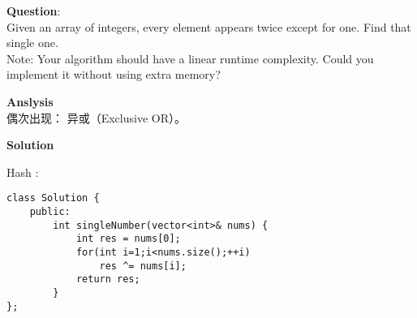     
\begin{description}
    \item{\textbf{Question}}:\\%
		Given an array of integers, every element appears twice except for one. Find that single one.\\
		Note: Your algorithm should have a linear runtime complexity. Could you implement it without using extra memory?\\

    \item{\textbf{Anslysis}}\\
		偶次出现： 异或（Exclusive OR）。\\

    \item{\textbf{Solution}}\\
	\item{Hash} : \\
		\begin{lstlisting}
class Solution {
    public:
        int singleNumber(vector<int>& nums) {
            int res = nums[0];
            for(int i=1;i<nums.size();++i) 
                res ^= nums[i];
            return res;
        }
};
		\end{lstlisting}

\end{description}

